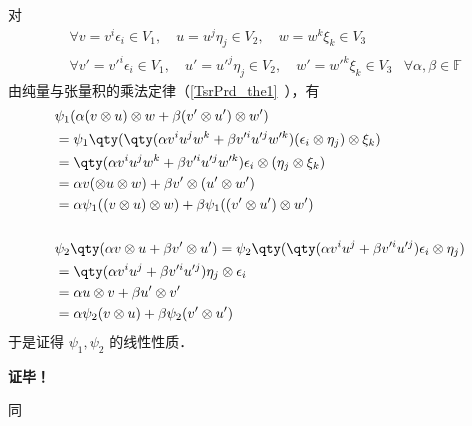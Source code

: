 对
\begin{equation}
\begin{aligned}
&\forall v=v^i\epsilon_i\in V_1,\quad u=u^j\eta_j\in V_2,\quad w=w^k\xi_k\in V_3\\
&\forall v'=v'^i\epsilon_i\in V_1,\quad u'=u'^j\eta_j\in V_2,\quad w'=w'^k\xi_k\in V_3
&\forall \alpha,\beta \in\mathbb F
\end{aligned}
\end{equation}
由纯量与张量积的乘法定律（\autoref{TsrPrd_the1}~），有
\begin{equation}
\begin{aligned}
&\psi_1(\alpha(v\otimes u)\otimes w+\beta(v'\otimes u')\otimes w')\\
&=\psi_1\qty(\qty(\alpha v^iu^jw^k+\beta v'^iu'^jw'^k)(\epsilon_i\otimes\eta_j)\otimes\xi_k)\\
&=\qty(\alpha v^iu^jw^k+\beta v'^iu'^jw'^k)\epsilon_i\otimes(\eta_j\otimes\xi_k)\\
&=\alpha v(\otimes u\otimes w)+\beta v'\otimes (u'\otimes w')\\
&=\alpha\psi_1((v\otimes u)\otimes w)+\beta\psi_1((v'\otimes u')\otimes w')\\
\\
&\psi_2\qty(\alpha v\otimes u+\beta v'\otimes u')=\psi_2\qty(\qty(\alpha v^iu^j+\beta v'^iu'^j)\epsilon_i\otimes\eta_j)\\
&=\qty(\alpha v^iu^j+\beta v'^iu'^j)\eta_j\otimes\epsilon_i\\
&=\alpha u\otimes v+\beta u'\otimes v'\\
&=\alpha\psi_2(v\otimes u)+\beta\psi_2(v'\otimes u')
\end{aligned}
\end{equation}
于是证得  $\psi_1,\psi_2$ 的线性性质．

\textbf{证毕！}

同
